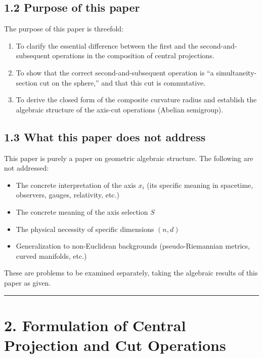 \documentclass[a4paper,11pt]{article}
\theoremstyle{definition}
\theoremstyle{remark}
\providecommand{\tightlist}{%
  \setlength{\itemsep}{0pt}\setlength{\parskip}{0pt}}
\begin{document}
\subsection{1.2 Purpose of this paper}\label{purpose-of-this-paper}

The purpose of this paper is threefold:

\begin{enumerate}
\def\labelenumi{\arabic{enumi}.}
\tightlist
\item
  To clarify the essential difference between the first and the
  second-and-subsequent operations in the composition of central
  projections.
\item
  To show that the correct second-and-subsequent operation is ``a
  simultaneity-section cut on the sphere,'' and that this cut is
  commutative.
\item
  To derive the closed form of the composite curvature radius and
  establish the algebraic structure of the axis-cut operations (Abelian
  semigroup).
\end{enumerate}

\subsection{1.3 What this paper does not
address}\label{what-this-paper-does-not-address}

This paper is purely a paper on geometric algebraic structure. The
following are not addressed:

\begin{itemize}
\tightlist
\item
  The concrete interpretation of the axis \(x_i\) (its specific meaning
  in spacetime, observers, gauges, relativity, etc.)
\item
  The concrete meaning of the axis selection \(S\)
\item
  The physical necessity of specific dimensions \((n, d)\)
\item
  Generalization to non-Euclidean backgrounds (pseudo-Riemannian
  metrics, curved manifolds, etc.)
\end{itemize}

These are problems to be examined separately, taking the algebraic
results of this paper as given.

\begin{center}\rule{0.5\linewidth}{0.5pt}\end{center}

\section{2. Formulation of Central Projection and Cut
Operations}\label{formulation-of-central-projection-and-cut-operations}
\end{document}
